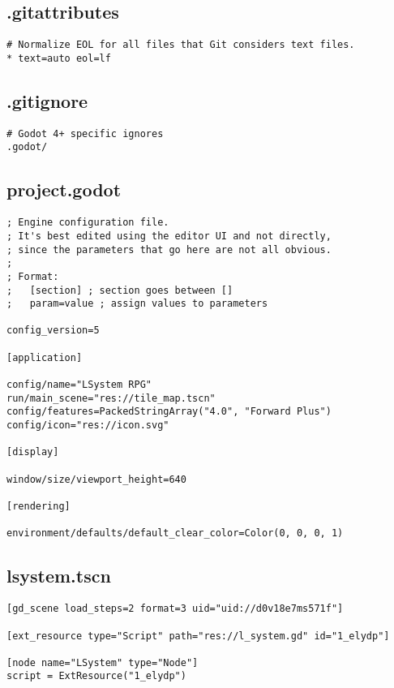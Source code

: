 \subsection{.gitattributes}

\begin{lstlisting}
# Normalize EOL for all files that Git considers text files.
* text=auto eol=lf
\end{lstlisting}

\subsection{.gitignore}

\begin{lstlisting}
# Godot 4+ specific ignores
.godot/
\end{lstlisting}

\subsection{project.godot}

\begin{lstlisting}
; Engine configuration file.
; It's best edited using the editor UI and not directly,
; since the parameters that go here are not all obvious.
;
; Format:
;   [section] ; section goes between []
;   param=value ; assign values to parameters

config_version=5

[application]

config/name="LSystem RPG"
run/main_scene="res://tile_map.tscn"
config/features=PackedStringArray("4.0", "Forward Plus")
config/icon="res://icon.svg"

[display]

window/size/viewport_height=640

[rendering]

environment/defaults/default_clear_color=Color(0, 0, 0, 1)
\end{lstlisting}

\subsection{l\textunderscore{}system.tscn}

\begin{lstlisting}
[gd_scene load_steps=2 format=3 uid="uid://d0v18e7ms571f"]

[ext_resource type="Script" path="res://l_system.gd" id="1_elydp"]

[node name="LSystem" type="Node"]
script = ExtResource("1_elydp")
\end{lstlisting}

